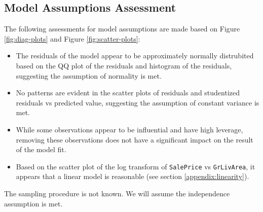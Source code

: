 \documentclass[american,]{article}
\providecommand{\tightlist}{%
  \setlength{\itemsep}{0pt}\setlength{\parskip}{0pt}}
\theoremstyle{definition}
\theoremstyle{definition}
\theoremstyle{definition}
\theoremstyle{remark}
\begin{document}
\hypertarget{model-assumptions-assessment}{%
\subsection{Model Assumptions
Assessment}\label{model-assumptions-assessment}}

The following assessments for model assumptions are made based on Figure
\ref{fig:diag-plots} and Figure \ref{fig:scatter-plots}:

\begin{itemize}
\tightlist
\item
  The residuals of the model appear to be approximately normally
  distrubited based on the QQ plot of the residuals and histogram of the
  residuals, suggesting the assumption of normality is met.
\item
  No patterns are evident in the scatter plots of residuals and
  studentized residuals vs predicted value, suggesting the assumption of
  constant variance is met.
\item
  While some observations appear to be influential and have high
  leverage, removing these observations does not have a significant
  impact on the result of the model fit.
\item
  Based on the scatter plot of the log transform of \texttt{SalePrice}
  vs \texttt{GrLivArea}, it appears that a linear model is reasonable
  (see section \ref{appendix:linearity}).
\end{itemize}

The sampling procedure is not known. We will assume the independence
assumption is met.
\end{document}
